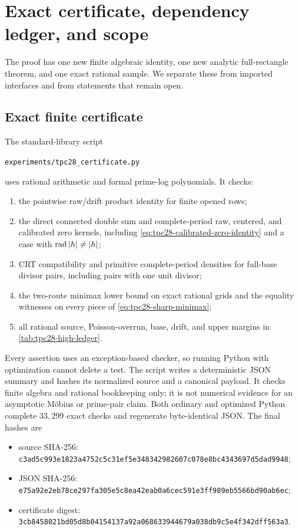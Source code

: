 \section{Exact certificate, dependency ledger, and scope}
\label{sec:tpc28-certificate-scope}

The proof has one new finite algebraic identity, one new analytic
full-rectangle theorem, and one exact rational sample.  We separate
these from imported interfaces and from statements that remain open.

\subsection{Exact finite certificate}

The standard-library script
\begin{center}
\texttt{experiments/tpc28\_certificate.py}
\end{center}
uses rational arithmetic and formal prime-log polynomials.  It checks:
\begin{enumerate}[label=\textup{(\roman*)}]
 \item the pointwise raw/drift product identity for finite opened rows;
 \item the direct connected double sum and complete-period raw,
 centered, and calibrated zero kernels, including
 \eqref{eq:tpc28-calibrated-zero-identity} and a case with
 $\operatorname{rad}|h|\ne|h|$;
 \item CRT compatibility and primitive complete-period densities for
 full-base divisor pairs, including pairs with one unit divisor;
 \item the two-route minimax lower bound on exact rational grids and
 the equality witnesses on every piece of
 \eqref{eq:tpc28-sharp-minimax};
 \item all rational source, Poisson-overrun, base, drift, and upper
 margins in \cref{tab:tpc28-high-ledger}.
\end{enumerate}
Every assertion uses an exception-based checker, so running Python with
optimization cannot delete a test.  The script writes a deterministic
JSON summary and hashes its normalized source and a canonical payload.
It checks finite algebra and rational bookkeeping only; it is not
numerical evidence for an asymptotic M\"obius or prime-pair claim.
Both ordinary and optimized Python complete $33{,}299$ exact checks
and regenerate byte-identical JSON.  The final hashes are
\begin{itemize}[leftmargin=2.2em]
 \item source SHA-256:
 \nolinkurl{c3ad5c993e1823a4752c5c31ef5e348342982607c078e8bc4343697d5dad9948};
 \item JSON SHA-256:
 \nolinkurl{e75a92e2eb78ce297fa305e5c8ea42eab0a6cec591e3ff989eb5566bd90ab6ec};
 \item certificate digest:
 \nolinkurl{3cb8458021bd05d8b04154137a92a068633944679a038db9c5e4f342dff563a3}.
\end{itemize}

